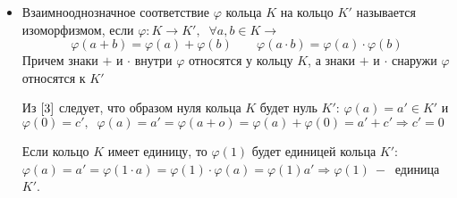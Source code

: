 \begin{itemize}
    \begin{theorem}
        (Безу) $P_n(x)$ делится на $x-c\Leftrightarrow P_n(c)=0$.
    \end{theorem}
    
    \begin{theorem}
        Если кольцо $A$ является областью целостности, то число корней $P_n(x)$ не превосходит $n$.
    \end{theorem}
    
    \begin{theorem}
        Основная теорема алгебры \par
        Любой многочлен $P_n(x)$ над $\mathds{C}$ имеет хотя бы один корень.
    \end{theorem}

    \begin{proposition}
        Из $3$ и $5$ теоремы
        \begin{equation}
            \forall P_n(x)\rightarrow P_n(x)=a_n(x-c_1)^{l_1}\cdot \dots
            \cdot (x-c_k)^{l_k} 
        \end{equation}
    \end{proposition}

    \item Взаимнооднозначное соответствие $\varphi$ кольца $K$ на кольцо $K'$ называется изоморфизмом, если $\varphi : K \rightarrow K',\;\;\forall a,b\in K \rightarrow$
    \begin{equation}
        \label{3}
        \varphi(a+b)=\varphi(a)+\varphi(b)\;\;\;\;\;\;\;\varphi(a\cdot b)=\varphi(a)\cdot\varphi(b)
    \end{equation}
    Причем знаки $+$ и $\cdot$ внутри $\varphi$ относятся у кольцу $K$, а знаки $+$ и $\cdot$ снаружи $\varphi$ относятся к $K'$\par
    Из $\eqref{3}$ следует, что образом нуля кольца $K$ будет нуль $K'$: $\varphi(a)=a'\in K'$ и $\varphi(0)=c',\;\;\varphi(a)=a'=\varphi(a+o) = \varphi(a)+\varphi(0)=a'+c'\Rightarrow c'=0$\par
    Если кольцо $K$ имеет единицу, то $\varphi(1)$ будет единицей кольца $K'$: $\varphi(a)=a'=\varphi(1\cdot a )= \varphi(1)\cdot \varphi(a) = \varphi(1) a'\Rightarrow\varphi(1)~-~$ единица $K'$.
    

\end{itemize}
